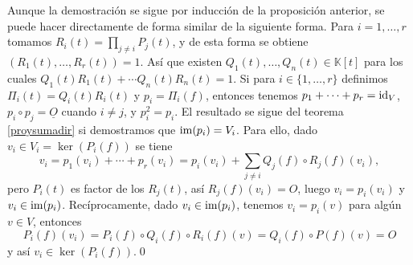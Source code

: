 \dem Aunque la demostración se sigue por inducción de la proposición anterior, se puede hacer directamente de forma similar de la siguiente forma. Para $i=1,\ldots,r$ tomamos $R_i(t)=\prod_{j\ne i}P_j(t)$, y de esta forma se obtiene $(R_1(t),\ldots,R_r(t))=1$. Así que existen $Q_1(t),\ldots, Q_n(t)\in \mathbb{K}[t]$ para los cuales $Q_1(t)R_1(t)+\cdots Q_n(t)R_n(t)=1$. Si para $i\in\{1,\ldots,r\}$ definimos $\Pi_i(t)=Q_i(t)R_i(t)$ y $p_i=\Pi_i(f)$, entonces tenemos $p_1+\cdots+p_r=\operatorname{id}_V$,
$p_i\circ p_j=\underline{O}$ cuando $i\ne j$, y $p_i^2=p_i$. El resultado se sigue del teorema \ref{proysumadir} si demostramos que $\operatorname{im}(p_i)=V_i$. Para ello, dado $v_i\in V_i=\ker(P_i(f))$ se tiene
$$v_i=p_1(v_i)+\cdots+p_r(v_i)=p_i(v_i)+\sum_{j\ne i} Q_j(f)\circ R_j(f)(v_i),$$
pero $P_i(t)$ es factor de los $R_j(t)$, así $R_j(f)(v_i)=O$, luego $v_i=p_i(v_i)$ y $v_i\in\operatorname{im}(p_i)$. Recíprocamente, dado $v_i\in\operatorname{im}(p_i)$, tenemos $v_i=p_i(v)$ para algún $v\in V$, entonces 
$$P_i(f)(v_i)=P_i(f)\circ Q_i(f)\circ R_i(f)(v)=Q_i(f)\circ P(f)(v)=O$$
y así $v_i\in\ker(P_i(f))$.\qed

